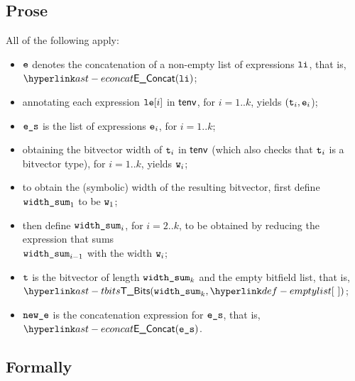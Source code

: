 \subsection{Prose}
All of the following apply:
\begin{itemize}
  \item $\ve$ denotes the concatenation of a non-empty list of expressions $\vli$, that is, \\ $\EConcat(\vli)$;
  \item annotating each expression $\vle[i]$ in $\tenv$, for $i=1..k$, yields $(\vt_i, \ve_i$)\ProseOrTypeError;
  \item $\ves$ is the list of expressions $\ve_i$, for $i=1..k$;
  \item obtaining the bitvector width of $\vt_i$ in $\tenv$ (which also checks that $\vt_i$ is a bitvector type),
        for $i=1..k$, yields $\vw_i$\ProseOrTypeError;
  \item to obtain the (symbolic) width of the resulting bitvector, first define $\widthsum_1$ to be $\vw_1$;
  \item then define $\widthsum_i$, for $i=2..k$, to be obtained by reducing the expression that sums \\ $\widthsum_{i-1}$ with the width $\vw_i$;
  \item $\vt$ is the bitvector of length $\widthsum_k$ and the empty bitfield list, that is, \\ $\TBits(\widthsum_k, \emptylist)$;
  \item $\newe$ is the concatenation expression for $\ves$, that is, $\EConcat(\ves)$.
\end{itemize}



\subsection{Formally}
\begin{mathpar}
\end{mathpar}

